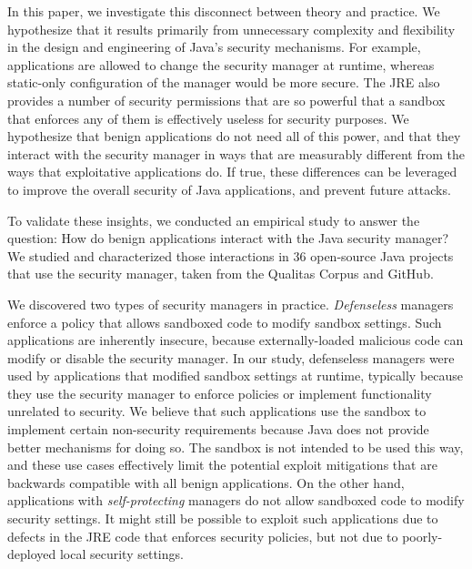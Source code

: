 \documentclass{sig-alternate}
\begin{document}
In this paper, we investigate this disconnect between theory and practice.  We
hypothesize that it results primarily from unnecessary complexity and flexibility
in the design and engineering of Java's security mechanisms.  For example,
applications are allowed to change the security manager at runtime, whereas 
static-only configuration of the manager would be more secure. The JRE also
provides a number of security permissions that are so powerful that a sandbox
that enforces any of them is effectively useless for security purposes.  We 
hypothesize that benign applications do not need all of this power, and that
they interact with the security manager in ways
that are measurably different from the ways that exploitative applications do.  
If true, these differences can be leveraged to improve the overall security of
Java applications, and prevent future attacks.

To validate these insights, we conducted an empirical study
to answer the question: How do benign
applications interact with the Java security manager?  We studied and
characterized those interactions in 36
open-source Java projects that use the security manager, taken from the Qualitas
Corpus \cite{QualitasCorpus:APSEC:2010} and GitHub.  

We discovered two types of security managers in
practice. \emph{Defenseless} managers enforce a policy that allows sandboxed code
to modify sandbox settings. Such applications
are inherently insecure, because externally-loaded malicious code can
modify or disable the security manager.  In our study, defenseless managers were
used by applications that modified sandbox settings at runtime, typically because
they use the security manager to enforce policies or implement functionality
unrelated to security.  We believe that such applications use the
sandbox to implement certain non-security requirements
because Java does not provide better mechanisms for doing so.  
The sandbox is not intended to be used this way, and these use cases
effectively limit the potential exploit mitigations that are
backwards compatible with all benign applications. 
On the other hand, applications with \emph{self-protecting} managers do 
not allow sandboxed code to modify security settings. 
It might still be possible to exploit
such applications due to defects in the JRE code that enforces security
policies, but not due to poorly-deployed local security settings.
\end{document}
